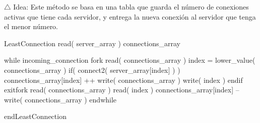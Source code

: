 
$\triangle$ Idea: Este método se basa en una tabla que guarda el número de conexiones activas que tiene cada servidor, y entrega la nueva conexión
al servidor que tenga el menor número.

\begin{verbatimtab}[\myTabs]

LeastConnection
	read( server_array )
	connections_array
	
	while incoming_connection
		fork
			read( connections_array )
			index = lower_value( connections_array )
			if( connect2( server_array[index] ) )
				connections_array[index] ++
				write( connections_array )
				write( index )
			endif
		exitfork
		read( connections_array )
		read( index )
		connections_array[index] --
		write( connections_array )
	endwhile

endLeastConnection

\end{verbatimtab}